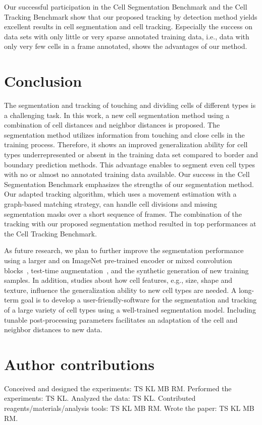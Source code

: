 \documentclass[10pt,letterpaper]{article}
\begin{document}
Our successful participation in the Cell Segmentation Benchmark and the Cell Tracking Benchmark show that our proposed tracking by detection method yields excellent results in cell segmentation and cell tracking. Especially the success on data sets with only little or very sparse annotated training data, i.e., data with only very few cells in a frame annotated, shows the advantages of our method.

\section*{Conclusion}
\label{sec:conclusion}
The segmentation and tracking of touching and dividing cells of different types is a challenging task. In this work, a new cell segmentation method using a combination of cell distances and neighbor distances is proposed. The segmentation method utilizes information from touching and close cells in the training process. Therefore, it shows an improved generalization ability for cell types underrepresented or absent in the training data set compared to border and boundary prediction methods. This advantage enables to segment even cell types with no or almost no annotated training data available. Our success in the Cell Segmentation Benchmark emphasizes the strengths of our segmentation method. Our adapted tracking algorithm, which uses a movement estimation with a graph-based matching strategy, can handle cell divisions and missing segmentation masks over a short sequence of frames. The combination of the tracking with our proposed segmentation method resulted in top performances at the Cell Tracking Benchmark.

As future research, we plan to further improve the segmentation performance using a larger and on ImageNet pre-trained encoder or mixed convolution blocks~\cite{Huang2020}, test-time augmentation~\cite{Moshkov2020}, and the synthetic generation of new training samples\cite{Hollandi2019}. In addition, studies about how cell features, e.g., size, shape and texture, influence the generalization ability to new cell types are needed. A long-term goal is to develop a user-friendly-software for the segmentation and tracking of a large variety of cell types using a well-trained segmentation model. Including tunable post-processing parameters facilitates an adaptation of the cell and neighbor distances to new data.

\section*{Author contributions}
Conceived and designed the experiments: TS KL MB RM. Performed the experiments: TS KL. Analyzed the data: TS KL. Contributed reagents/materials/analysis tools: TS KL MB RM. Wrote the paper: TS KL MB RM.
\end{document}
